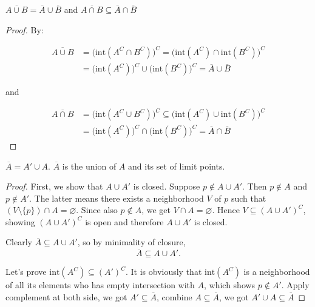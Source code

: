 \begin{thm}
    $\overline{A \cup B} = \overline{A} \cup \overline{B}$ and  $\overline{A \cap B} \subseteq \overline{A} \cap \overline{B}$
\end{thm}

\begin{proof}
   By:
   
   \begin{align*}
    \overline{A \cup B} &= \bigl( \mathrm{int}(A^C \cap B^C) \bigr)^C = \bigl( \mathrm{int}(A^C) \cap \mathrm{int}(B^C) \bigr)^C \\
    & = \bigl( \mathrm{int}(A^C) \bigr)^C \cup \bigl( \mathrm{int}(B^C) \bigr)^C = \overline{A} \cup \overline{B}
   \end{align*}

   and


   \begin{align*}
    \overline{A \cap B} &= \bigl( \mathrm{int}(A^C \cup B^C) \bigr)^C \subseteq \bigl( \mathrm{int}(A^C) \cup \mathrm{int}(B^C) \bigr)^C \\
    & = \bigl( \mathrm{int}(A^C) \bigr)^C \cap \bigl( \mathrm{int}(B^C) \bigr)^C = \overline{A} \cap \overline{B}
   \end{align*}
\end{proof}

\begin{thm}
    $\overline{A} = A' \cup A$. $\overline{A}$ is the union of $A$ and its set of limit points.
\end{thm}

\begin{proof}
    First, we show that $A \cup A'$ is closed. Suppose $p \notin A \cup A'$. 
    Then $p \notin A$ and $p \notin A'$. 
    The latter means there exists a neighborhood $V$ of $p$ such that 
    $(V \setminus \{p\}) \cap A = \varnothing$. Since also $p \notin A$, we get $V \cap A = \varnothing$. 
    Hence $V \subseteq (A \cup A')^C$, showing $(A \cup A')^C$ is open and therefore $A \cup A'$ is closed.

    Clearly $\overline{A} \subseteq A \cup A'$, so by minimality of closure,
    \[
        \overline{A} \subseteq A \cup A'.
    \]

    Let's prove $\mathrm{int}(A^C) \subseteq (A')^C$. It is obviously that 
    $\mathrm{int}(A^C)$ is a neighborhood of all its elements who has empty
    intersection with $A$, which shows $p \notin A'$. Apply complement at both side,
    we got $A' \subseteq \overline{A}$, combine $A \subseteq \overline{A}$, we got 
    $A' \cup A \subseteq \overline{A}$
\end{proof}

